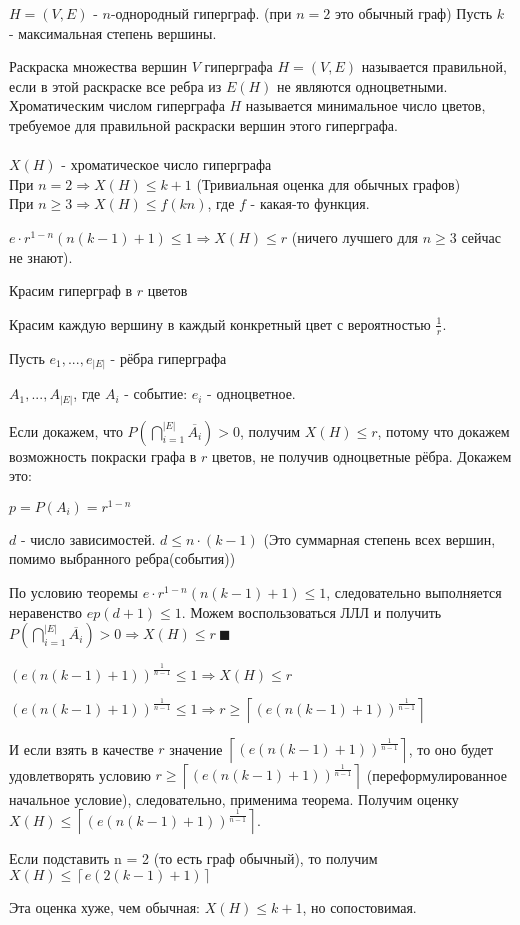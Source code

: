 $H = (V, E)$ - $n$-однородный гиперграф. (при $n = 2$ это обычный граф)
Пусть $k$ - максимальная степень вершины.

\Def Раскраска множества вершин $V$ гиперграфа $H = (V, E)$ называется правильной, если в этой раскраске все ребра из $E(H)$ не являются одноцветными. Хроматическим числом гиперграфа $H$ называется минимальное число цветов, требуемое для правильной раскраски вершин этого гиперграфа. 
\\
\\
$X(H)$ - хроматическое число гиперграфа \\
При $n = 2 \Rightarrow X(H) \leq k + 1$ (Тривиальная оценка для обычных графов) \\
При $n \geq 3 \Rightarrow X(H) \leq f(kn)$, где $f$ - какая-то функция.

\Th $e \cdot r^{1-n}(n(k-1)+1)  \leq 1 \Rightarrow X(H) \leq r$ (ничего лучшего для $n \geq 3$ сейчас не знают).

\Proof

Красим гиперграф в $r$ цветов

Красим каждую вершину в каждый конкретный цвет с вероятностью $\frac{1}{r}$.

Пусть $e_1, ..., e_{|E|}$ - рёбра гиперграфа

$A_1, ..., A_{|E|}$, где $A_i$ - событие: $e_i$ - одноцветное.

Если докажем, что $P(\bigcap_{i=1}^{|E|} \overline{A_i}) > 0$, получим $X(H) \leq r$, потому что докажем возможность покраски графа в $r$ цветов, не получив одноцветные рёбра. Докажем это:

$p = P(A_i) = r^{1-n}$

$d$ - число зависимостей. $d \leq n \cdot (k - 1)$ (Это суммарная степень всех вершин, помимо выбранного ребра(события))

По условию теоремы $e \cdot r^{1-n}(n(k-1)+1) \leq 1$, следовательно выполняется неравенство $e p (d + 1) \leq 1$. Можем воспользоваться ЛЛЛ и получить $P(\bigcap_{i=1}^{|E|} \overline{A_i}) > 0 \Rightarrow X(H) \leq r  \ \blacksquare$

$(e(n(k-1)+1))^{\frac{1}{n-1}} \leq 1 \Rightarrow X(H) \leq r$ 

$(e(n(k-1)+1))^{\frac{1}{n-1}} \leq 1 \Rightarrow r \geq \left\lceil (e(n(k-1)+1))^{\frac{1}{n-1}} \right\rceil$

И если взять в качестве $r$ значение $\left\lceil (e(n(k-1)+1))^{\frac{1}{n-1}} \right\rceil$, то оно будет удовлетворять условию $r \geq \left\lceil (e(n(k-1)+1))^{\frac{1}{n-1}} \right\rceil$ (переформулированное начальное условие), следовательно, применима теорема. Получим оценку $X(H) \leq \left\lceil (e(n(k-1)+1))^{\frac{1}{n-1}} \right\rceil$.

Если подставить n = 2 (то есть граф обычный), то получим $X(H) \leq \left\lceil e(2(k-1)+1) \right\rceil$

Эта оценка хуже, чем обычная: $X(H) \leq k + 1$, но сопостовимая.